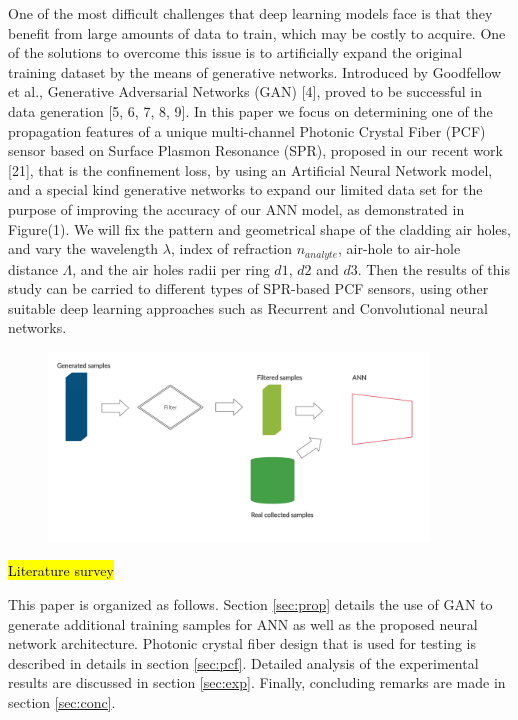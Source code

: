 \documentclass[draft, a4, 10pt, onecolumn]{IEEEtran}
\begin{document}
One of the most difficult challenges that deep learning models face is that they benefit from large amounts of data to train, which may be costly to acquire. One of the solutions to overcome this issue is to artificially expand the original training dataset by the means of generative networks. Introduced by Goodfellow et al., Generative Adversarial Networks (GAN) [4], proved to be successful in data generation [5, 6, 7, 8, 9]. 
In this paper we focus on determining one of the propagation features of a unique multi-channel Photonic Crystal Fiber (PCF) sensor based on Surface Plasmon Resonance (SPR), proposed in our recent work [21], that is the confinement loss, by using an Artificial Neural Network model, and a special kind generative networks to expand our limited data set for the purpose of  improving the accuracy of our ANN model, as demonstrated in Figure(1). We will fix the pattern and geometrical shape of the cladding air holes, and vary the wavelength $\lambda$, index of refraction $n_{analyte} $, air-hole to air-hole distance $ \Lambda $, and the air holes radii per ring $d1$, $d2$ and $d3$. Then the results of this study can be carried to different types of SPR-based PCF sensors, using other suitable deep learning approaches such as Recurrent and Convolutional neural networks. 

\begin{figure}
\centering
\includegraphics[trim= 0 0 0 0, clip, width=0.9\textwidth]{mainalgo.png}
\caption{}
\end{figure} 

\hl{Literature survey}

This paper is organized as follows. Section \ref{sec:prop} details the use of GAN to generate additional training samples for ANN as well as the proposed neural network architecture. Photonic crystal fiber design that is used for testing is described in details in section \ref{sec:pcf}. Detailed analysis of the experimental results are discussed in section \ref{sec:exp}. Finally, concluding remarks are made in section \ref{sec:conc}.
\end{document}
